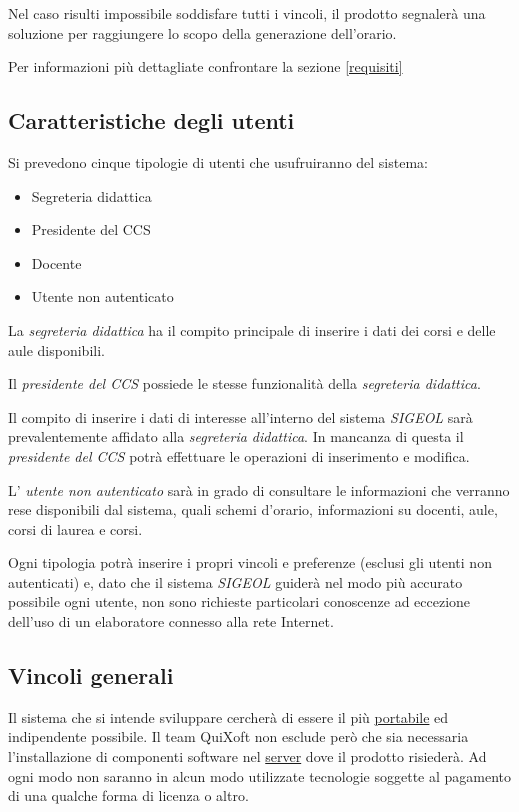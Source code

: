 \documentclass[11pt,a4paper]{article}
\begin{document}
Nel caso risulti impossibile soddisfare tutti i vincoli, il prodotto segnalerà una soluzione per raggiungere lo scopo della generazione dell'orario.

Per informazioni più dettagliate confrontare la sezione \ref{requisiti}
\subsection{Caratteristiche degli utenti} \label{utenti}
Si prevedono cinque tipologie di utenti che usufruiranno del sistema:
\begin{itemize}
 \item Segreteria didattica
 \item Presidente del CCS
 \item Docente
 \item Utente non autenticato
\end{itemize}

La \textit{segreteria didattica} ha il compito principale di inserire i dati dei corsi e delle aule disponibili.


Il \textit{presidente del CCS} possiede le stesse funzionalità della \textit{segreteria didattica}. 


Il compito di inserire i dati di interesse all'interno del sistema \textit{SIGEOL} sarà prevalentemente affidato alla \textit{segreteria didattica}. In mancanza di questa il \textit{presidente del CCS} potrà effettuare le operazioni di inserimento e modifica.

L' \textit{utente non autenticato} sarà in grado di consultare le informazioni che verranno rese disponibili dal sistema, quali schemi d'orario, informazioni su docenti, aule, corsi di laurea e corsi.

Ogni tipologia potrà inserire i propri vincoli e preferenze (esclusi gli utenti non autenticati) e, dato che il sistema \textit{SIGEOL} guiderà nel modo più accurato possibile ogni utente, non sono richieste particolari conoscenze ad eccezione dell'uso di un elaboratore connesso alla rete Internet.
\subsection{Vincoli generali}
Il sistema che si intende sviluppare cercherà di essere il più \underline{portabile} ed indipendente possibile. Il team QuiXoft non esclude però che sia necessaria l'installazione di componenti software nel \underline{server} dove il prodotto risiederà. Ad ogni modo non saranno in alcun modo utilizzate tecnologie soggette al pagamento di una qualche forma di licenza o altro.
\end{document}
